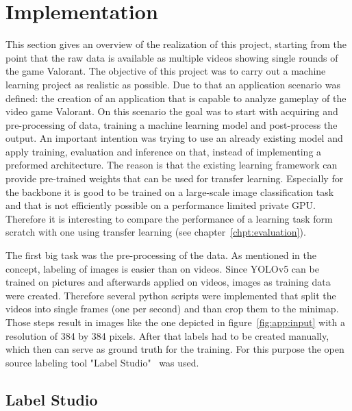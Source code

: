 \section{Implementation}\label{sec:app:impl}

This section gives an overview of the realization of this project, starting from the point that the raw 
data is available as multiple videos showing single rounds of the game Valorant. The objective of this 
project was to carry out a machine learning project as realistic as possible. Due to that an 
application scenario was defined: the creation of an application that is capable to analyze gameplay 
of the video game Valorant. On this scenario the goal was to start with acquiring and pre-processing 
of data, training a machine learning model and post-process the output. An important intention was 
trying to use an already existing model and apply training, evaluation and inference on that, instead 
of implementing a preformed architecture. The reason is that the existing learning framework can 
provide pre-trained weights that can be used for transfer learning. Especially for the backbone it is 
good to be trained on a large-scale image classification task~\cite{terven2023} and that is not 
efficiently possible on a performance limited private GPU. Therefore it is interesting to compare the 
performance of a learning task form scratch with one using transfer learning (see 
chapter~\ref{chpt:evaluation}).

The first big task was the pre-processing of the data. As mentioned in the concept, labeling of 
images is easier than on videos. Since YOLOv5 can be trained on pictures and afterwards applied on 
videos, images as training data were created. Therefore several python scripts were implemented 
that split the videos into single frames (one per second) and than crop them to the minimap. Those 
steps result in images like the one depicted in figure~\ref{fig:app:input} with a resolution of 384 by 
384 pixels. After that labels had to be created manually, which then can serve as ground truth for 
the training. For this purpose the open source labeling tool "Label Studio"~\cite{labelstudio} was 
used.

\subsection{Label Studio}\label{subsec:app:labelstudio}

